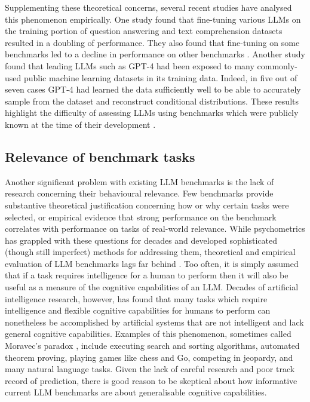 \documentclass{article}
\begin{document}
Supplementing these theoretical concerns, several recent studies have analysed this phenomenon empirically. One study found that fine-tuning various LLMs on the training portion of question answering and text comprehension datasets resulted in a doubling of performance. They also found that fine-tuning on some benchmarks led to a decline in performance on other benchmarks \citep{zhou2023don}. Another study found that leading LLMs such as GPT-4 had been exposed to many commonly-used public machine learning datasets in its training data. Indeed, in five out of seven cases GPT-4 had learned the data sufficiently well to be able to accurately sample from the dataset and reconstruct conditional distributions. These results highlight the difficulty of assessing LLMs using benchmarks which were publicly known at the time of their development \citep{bordt2024elephants}.

\subsection{Relevance of benchmark tasks}

Another significant problem with existing LLM benchmarks is the lack of research concerning their behavioural relevance. Few benchmarks provide substantive theoretical justification concerning how or why certain tasks were selected, or empirical evidence that strong performance on the benchmark correlates with performance on tasks of real-world relevance. While psychometrics has grappled with these questions for decades and developed sophisticated (though still imperfect) methods for addressing them, theoretical and empirical evaluation of LLM benchmarks lags far behind \citep{federiakin2025improving, reuel2024betterbench}. Too often, it is simply assumed that if a task requires intelligence for a human to perform then it will also be useful as a measure of the cognitive capabilities of an LLM. Decades of artificial intelligence research, however, has found that many tasks which require intelligence and flexible cognitive capabilities for humans to perform can nonetheless be accomplished by artificial systems that are not intelligent and lack general cognitive capabilities. Examples of this phenomenon, sometimes called Moravec's paradox \citep{hassabis2017artificial}, include executing search and sorting algorithms, automated theorem proving, playing games like chess and Go, competing in jeopardy, and many natural language tasks. Given the lack of careful research and poor track record of prediction, there is good reason to be skeptical about how informative current LLM benchmarks are about generalisable cognitive capabilities.
\end{document}
